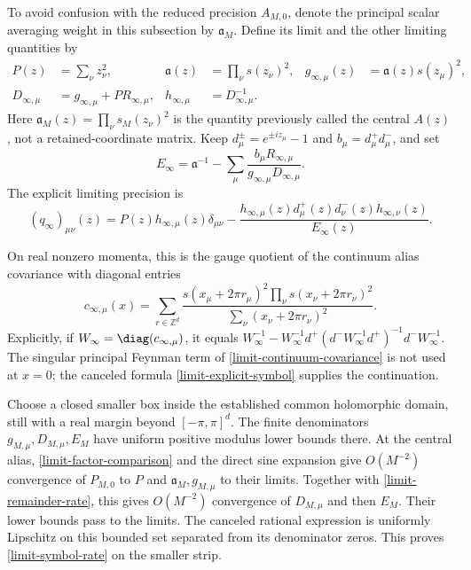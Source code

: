 To avoid confusion with the reduced precision $A_{M,0}$, denote the
principal scalar averaging weight in this subsection by
$\mathfrak a_M$. Define its limit and the other limiting quantities by
\begin{align}
 P(z)&=\sum_\nu z_\nu^2,&
 \mathfrak a(z)&=\prod_\nu s(z_\nu)^2,&
 g_{\infty,\mu}(z)&=\mathfrak a(z)s(z_\mu)^2,
 \label{limit-central}\\
 D_{\infty,\mu}&=g_{\infty,\mu}+P R_{\infty,\mu},&
 h_{\infty,\mu}&=D_{\infty,\mu}^{-1}.&&
 \nonumber
\end{align}
Here $\mathfrak a_M(z)=\prod_\nu s_M(z_\nu)^2$ is the quantity
previously called the central $A(z)$, not a retained-coordinate matrix.
Keep $d_\mu^\pm=e^{\pm iz_\mu}-1$ and $b_\mu=d_\mu^+d_\mu^-$,
and set
\begin{equation}\label{limit-E}
 E_\infty=\mathfrak a^{-1}-\sum_\mu
 \frac{b_\mu R_{\infty,\mu}}
      {g_{\infty,\mu}D_{\infty,\mu}}.
\end{equation}
The explicit limiting precision is
\begin{equation}\label{limit-explicit-symbol}
 (q_\infty)_{\mu\nu}(z)
 =P(z)h_{\infty,\mu}(z)\delta_{\mu\nu}
 -\frac{h_{\infty,\mu}(z)d_\mu^+(z)d_\nu^-(z)
                  h_{\infty,\nu}(z)}{E_\infty(z)}.
\end{equation}

On real nonzero momenta, this is the gauge quotient of the continuum
alias covariance with diagonal entries
\begin{equation}\label{limit-continuum-covariance}
 c_{\infty,\mu}(x)=
 \sum_{r\in\mathbb Z^d}
 \frac{s(x_\mu+2\pi r_\mu)^2
               \prod_\nu s(x_\nu+2\pi r_\nu)^2}
      {\sum_\nu(x_\nu+2\pi r_\nu)^2}.
\end{equation}
Explicitly, if $W_\infty=\diag(c_{\infty,\mu})$, it equals
$W_\infty^{-1}-W_\infty^{-1}d^+
(d^-W_\infty^{-1}d^+)^{-1}d^-W_\infty^{-1}$.
The singular principal Feynman term of
\eqref{limit-continuum-covariance} is not used at $x=0$; the canceled
formula \eqref{limit-explicit-symbol} supplies the continuation.

Choose a closed smaller box inside the established common holomorphic
domain, still with a real margin beyond $[-\pi,\pi]^d$. The finite
denominators $g_{M,\mu},D_{M,\mu},E_M$ have uniform positive modulus
lower bounds there. At the central alias,
\eqref{limit-factor-comparison} and the direct sine expansion give
$O(M^{-2})$ convergence of $P_{M,0}$ to $P$ and
$\mathfrak a_M,g_{M,\mu}$ to their limits. Together with
\eqref{limit-remainder-rate}, this gives $O(M^{-2})$ convergence of
$D_{M,\mu}$ and then $E_M$. Their lower bounds pass to the limits.
The canceled rational expression is uniformly Lipschitz on this
bounded set separated from its denominator zeros. This proves
\eqref{limit-symbol-rate} on the smaller strip.

